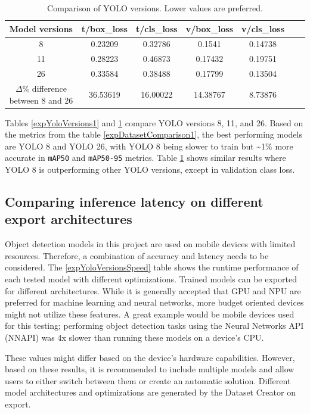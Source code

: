 \begin{table}[hbt]
\label{expYoloVersions2}
\caption{Comparison of YOLO versions. Lower values are preferred.}
\centering
\begin{tabular}{|c|c|c|c|c|c|c|}
\hline
Model versions & t/box\_loss & t/cls\_loss & v/box\_loss & v/cls\_loss \\ \hline
8              & 0.23209         & 0.32786         & 0.1541        & 0.14738       \\ \hline
11             & 0.28223         & 0.46873         & 0.17432       & 0.19751       \\ \hline
26             & 0.33584         & 0.38488         & 0.17799       & 0.13504       \\ \hline
$\Delta$\% difference between 8 and 26      & 36.53619        & 16.00022        & 14.38767      & 8.73876       \\ \hline
\end{tabular}
\end{table}

Tables \ref{expYoloVersions1} and \ref{expYoloVersions2} compare YOLO versions 8, 11, and 26. Based on the metrics from the table \ref{expDatasetComparison1}, the best performing models are YOLO 8 and YOLO 26, with YOLO 8 being slower to train but \textasciitilde 1\% more accurate in \texttt{mAP50} and \texttt{mAP50-95} metrics. Table \ref{expYoloVersions2} shows similar results where YOLO 8 is outperforming other YOLO versions, except in validation class loss.

\subsection{Comparing inference latency on different export architectures}
Object detection models in this project are used on mobile devices with limited resources. Therefore, a combination of accuracy and latency needs to be considered. The \ref{expYoloVersionsSpeed} table shows the runtime performance of each tested model with different optimizations. Trained models can be exported for different architectures. While it is generally accepted that GPU and NPU are preferred for machine learning and neural networks, more budget oriented devices might not utilize these features. A great example would be mobile devices used for this testing; performing object detection tasks using the Neural Networks API (NNAPI) was 4x slower than running these models on a device's CPU. 

These values might differ based on the device's hardware capabilities. However, based on these results, it is recommended to include multiple models and allow users to either switch between them or create an automatic solution. Different model architectures and optimizations are generated by the Dataset Creator on export.

